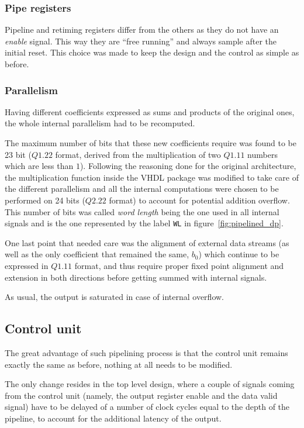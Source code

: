 \documentclass[a4paper]{article}
\begin{document}
\subsubsection{Pipe registers}
Pipeline and retiming registers differ from the others as they do not have an \emph{enable} signal. This way they are ``free running'' and always sample after the initial reset. 
This choice was made to keep the design and the control as simple as before.

\subsubsection{Parallelism}
Having different coefficients expressed as sums and products of the original ones, the whole internal parallelism had to be recomputed. 

The maximum number of bits that these new coefficients require was found to be 23 bit ($Q1.22$ format, derived from the multiplication of two $Q1.11$ numbers which are less than $1$). Following the reasoning done for the original architecture, the multiplication function inside the VHDL package was modified to take care of the different parallelism and all the internal computations were chosen to be performed on 24 bits ($Q2.22$ format) to account for potential addition overflow. This number of bits was called \emph{word length} being the one used in all internal signals and is the one represented by the label \texttt{WL} in figure~\ref{fig:pipelined_dp}.

One last point that needed care was the alignment of external data streams (as well as the only coefficient that remained the same, $b_0$) which continue to be expressed in $Q1.11$ format, and thus require proper fixed point alignment and extension in both directions before getting summed with internal signals. 

As usual, the output is saturated in case of internal overflow.

\subsection{Control unit}
The great advantage of such pipelining process is that the control unit remains exactly the same as before, nothing at all needs to be modified.

The only change resides in the top level design, where a couple of signals coming from the control unit (namely, the output register enable and the data valid signal) have to be delayed of a number of clock cycles equal to the depth of the pipeline, to account for the additional latency of the output. 
\end{document}
